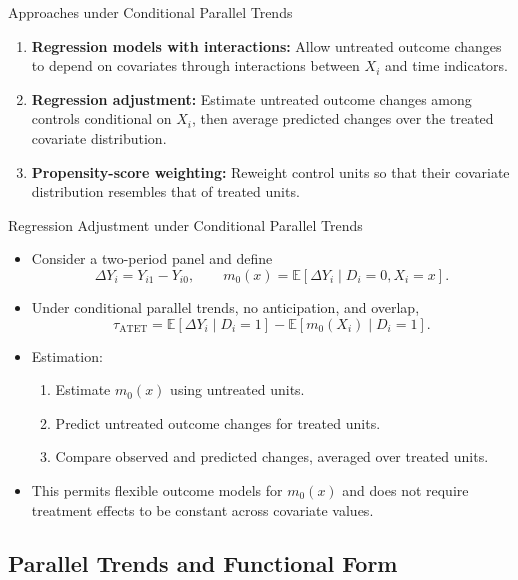 \documentclass[11pt,aspectratio=169]{beamer}
\newcommand{\E}{\mathbb{E}}
\begin{document}
\begin{frame}{Approaches under Conditional Parallel Trends}
\begin{enumerate}
  \item \textbf{Regression models with interactions:} Allow untreated outcome changes to depend on covariates through interactions between $X_i$ and time indicators.
  \item \textbf{Regression adjustment:} Estimate untreated outcome changes among controls conditional on $X_i$, then average predicted changes over the treated covariate distribution.
  \item \textbf{Propensity-score weighting:} Reweight control units so that their covariate distribution resembles that of treated units.
\end{enumerate}
\end{frame}

\begin{frame}{Regression Adjustment under Conditional Parallel Trends}
\begin{itemize}
  \item Consider a two-period panel and define
  \[\Delta Y_i=Y_{i1}-Y_{i0},\qquad m_0(x)=\E[\Delta Y_i\mid D_i=0,X_i=x].\]
  \item Under conditional parallel trends, no anticipation, and overlap,
  \[\tau_{\text{ATET}}=\E[\Delta Y_i\mid D_i=1]-\E[m_0(X_i)\mid D_i=1].\]
  \item Estimation:
  \begin{enumerate}
    \item Estimate $m_0(x)$ using untreated units.
    \item Predict untreated outcome changes for treated units.
    \item Compare observed and predicted changes, averaged over treated units.
  \end{enumerate}
  \item This permits flexible outcome models for $m_0(x)$ and does not require treatment effects to be constant across covariate values.
\end{itemize}
\end{frame}


\subsection{Parallel Trends and Functional Form}
\end{document}
